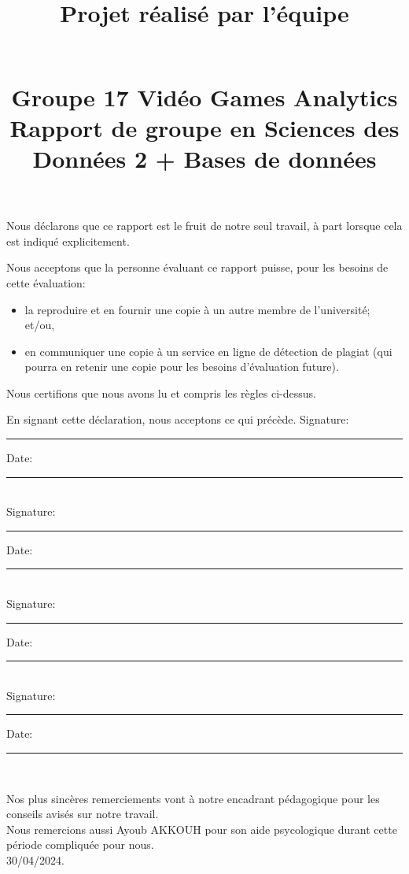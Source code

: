 \documentclass[mstat,12pt]{unswthesis}
\title{Projet réalisé par l'équipe \\
\strut \\
\textbf{Groupe 17 Vidéo Games Analytics}\\[0.5cm]Rapport de groupe en
Sciences des Données 2 + Bases de données}
\author{\Authornameonly}
\begin{document}
\beforepreface




\vskip 2pc \noindent Nous déclarons que ce rapport est le fruit de notre seul travail, à part lorsque cela est indiqué  explicitement. 

\vskip 2pc  \noindent Nous acceptons que la personne évaluant ce rapport puisse, pour les besoins de cette évaluation:
\begin{itemize}
\item la reproduire et en fournir une copie à un autre membre de l'université; et/ou,
\item en communiquer une copie à un service en ligne de détection de plagiat (qui pourra en retenir une copie pour les besoins d'évaluation future).
\end{itemize}

\vskip 2pc \noindent Nous certifions que nous avons lu et compris les règles ci-dessus.\vspace{24pt}

\vskip 2pc \noindent En signant cette déclaration, nous acceptons ce qui précède.
\vskip 2pc \noindent
Signature: \rule{7cm}{0.25pt} \hfill Date: \rule{4cm}{0.25pt} \\[1cm]
Signature: \rule{7cm}{0.25pt} \hfill Date: \rule{4cm}{0.25pt} \\[1cm]
Signature: \rule{7cm}{0.25pt} \hfill Date: \rule{4cm}{0.25pt} \\[1cm]
Signature: \rule{7cm}{0.25pt} \hfill Date: \rule{4cm}{0.25pt} \\[1cm]
\vskip 1pc





{\bigskip}Nos plus sincères remerciements vont à notre encadrant
pédagogique pour les conseils avisés sur notre travail.\\[1cm] Nous
remercions aussi Ayoub AKKOUH pour son aide psycologique durant cette
période compliquée pour nous.\\[1cm] 

{\bigskip\bigskip\bigskip\noindent} 30/04/2024.



\end{document}
